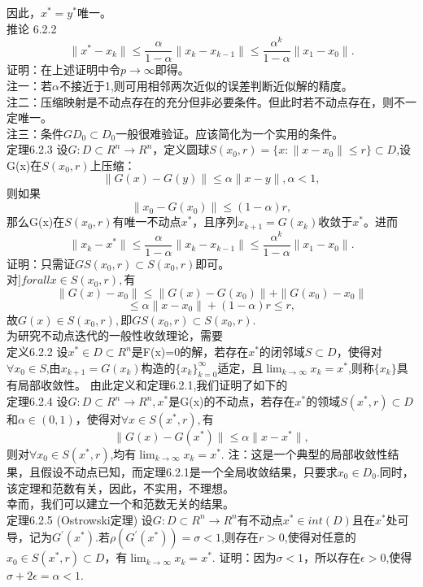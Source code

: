 \documentclass[a4paper,12pt]{article}
\begin{document}
\begin{CJK*}{UTF8}{gbsn}
	因此，$x^*=y^*$唯一。\\
	推论 6.2.2
	$$ \|x^*-x_k\|\leq \frac{\alpha}{1-\alpha}\|x_k-x_{k-1}\|\leq \frac{\alpha^k}{1-\alpha}\|x_1-x_0\|.  $$
	证明：在上述证明中令$p\to \infty$即得。\\
	注一：若$\alpha$不接近于1,则可用相邻两次近似的误差判断近似解的精度。\\
	注二：压缩映射是不动点存在的充分但非必要条件。但此时若不动点存在，则不一定唯一。\\
	注三：条件$GD_0\subset D_0$一般很难验证。应该简化为一个实用的条件。\\
	定理6.2.3 设$G:D\subset R^n \to R^n$，定义圆球$S(x_0,r)=\{x:\|x-x_0\|\leq r\}\subset D$,设G(x)在$S(x_0,r)$上压缩：\\
	$$\|G(x)-G(y)\|\leq \alpha\|x-y\|,\alpha<1,$$
	则如果
	$$\|x_0-G(x_0)\|\leq (1-\alpha)r,$$
	那么G(x)在$S(x_0,r)$有唯一不动点$x^*$，且序列$x_{k+1}=G(x_k)$收敛于$x^*$。进而
	$$\|x_k-x^*\|\leq \frac{\alpha}{1-\alpha}\|x_k-x_{k-1}\|\leq\frac{\alpha^k}{1-\alpha}\|x_1-x_0\|.$$
	证明：只需证$GS(x_0,r)\subset S(x_0,r)$即可。\\
	对$]forall x \in S(x_0,r),$有
	$$\|G(x)-x_0\|\leq \|G(x)-G(x_0)\|+\|G(x_0)-x_0\| $$
	$$ \leq\alpha\|x-x_0\|+(1-\alpha)r\leq r,$$
	故$G(x)\in S(x_0,r),$即$GS(x_0,r)\subset S(x_0,r).$\\
	为研究不动点迭代的一般性收敛理论，需要\\
	定义6.2.2 设$x^*\in D \subset R^n$是F(x)=0的解，若存在$x^*$的闭邻域$S\subset D$，使得对$\forall x_0\in S$,由$x_{k+1}=G(x_k)$构造的$\{x_k\}_{k=0}^\infty$适定，且$\lim_{k\to \infty}x_k=x^*$,则称$\{x_k\}$具有局部收敛性。
	由此定义和定理6.2.1,我们证明了如下的\\
	定理6.2.4 设$G:D\subset R^n \to R^n,x^*$是G(x)的不动点，若存在$x^*$的领域$S(x^*,r)\subset D$和$\alpha\in (0,1)$，使得对$\forall x \in S(x^*,r),$有
	$$\|G(x)-G(x^*)\|\leq \alpha\|x-x^*\|,$$
	则对$\forall x_0 \in S(x^*,r)$,均有$\lim_{k\to \infty}x_k = x^*$.
	注：这是一个典型的局部收敛性结果，且假设不动点已知，而定理6.2.1是一个全局收敛结果，只要求$x_0\in D_0$.同时，该定理和范数有关，因此，不实用，不理想。\\
	幸而，我们可以建立一个和范数无关的结果。\\
	定理6.2.5 (Ostrowski定理) 设$G:D\subset R^n \to R^n$有不动点$x^*\in int(D)$且在$x^*$处可导，记为$G^{'}(x^*)$.若$\rho(G^{'}(x^*))=\sigma<1$,则存在$r>0$,使得对任意的$x_0\in S(x^*,r)\subset D$，有$\lim_{k\to \infty}x_k = x^*$.
	证明：因为$\sigma < 1$，所以存在$\epsilon>0$,使得$\sigma + 2\epsilon = \alpha <1$.\\

\end{CJK*}
\end{document}
